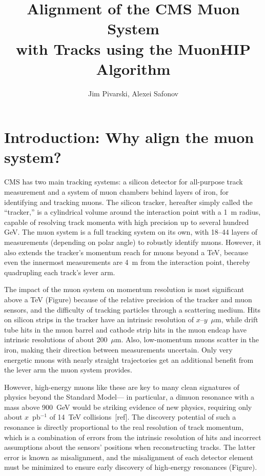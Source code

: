 \documentclass[12pt]{article}
\title{Alignment of the CMS Muon System \\ with Tracks using the MuonHIP Algorithm}
\author{Jim Pivarski, Alexei Safonov}
\begin{document}
\maketitle

\section{Introduction: Why align the muon system?}

CMS has two main tracking systems: a silicon detector for all-purpose
track measurement and a system of muon chambers behind layers of iron,
for identifying and tracking muons.  The silicon tracker, hereafter
simply called the ``tracker,'' is a cylindrical volume around the
interaction point with a 1~m radius, capable of resolving track
momenta with high precision up to several hundred GeV.  The muon
system is a full tracking system on its own, with 18--44 layers of
measurements (depending on polar angle) to robustly identify muons.
However, it also extends the tracker's momentum reach for muons beyond
a TeV, because even the innermost measurements are 4~m from the
interaction point, thereby quadrupling each track's lever arm.

The impact of the muon system on momentum resolution is most
significant above a TeV (Figure) because of the relative precision of
the tracker and muon sensors, and the difficulty of tracking particles
through a scattering medium.  Hits on silicon strips in the tracker
have an intrinsic resolution of $x$--$y$~$\mu$m, while drift tube hits
in the muon barrel and cathode strip hits in the muon endcap have
intrinsic resolutions of about 200~$\mu$m.  Also, low-momentum muons
scatter in the iron, making their direction between measurements
uncertain.  Only very energetic muons with nearly straight
trajectories get an additional benefit from the lever arm the muon
system provides.

However, high-energy muons like these are key to many clean signatures
of physics beyond the Standard Model--- in particular, a dimuon
resonance with a mass above 900~GeV would be striking evidence of new
physics, requiring only about $x$~pb$^{-1}$ of 14~TeV
collisions~[ref].  The discovery potential of such a resonance is
directly proportional to the real resolution of track momentum, which
is a combination of errors from the intrinsic resolution of hits and
incorrect assumptions about the sensors' positions when reconstructing
tracks.  The latter error is known as misalignment, and the
misalignment of each detector element must be minimized to ensure
early discovery of high-energy resonances (Figure).
\end{document}
